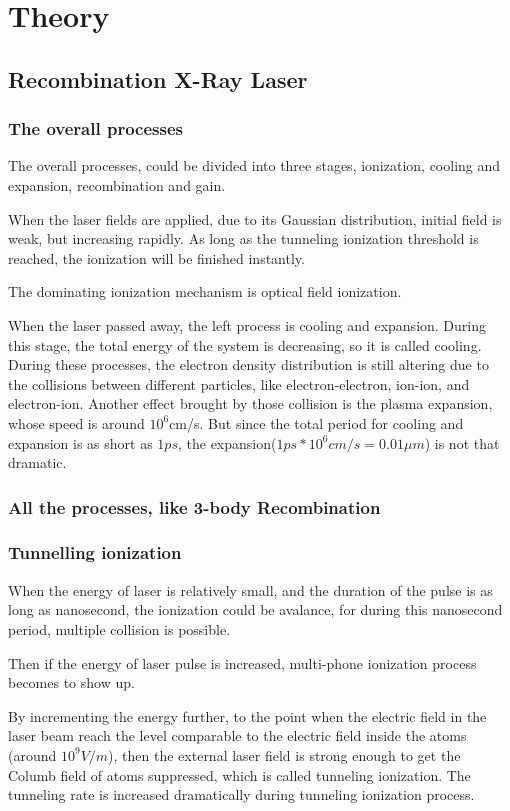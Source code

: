 \chapter{Theory\label{ch:theory}}
\section{Recombination X-Ray Laser}
\subsection{The overall processes}
The overall processes, could be divided into three stages, ionization,
cooling and expansion, recombination and gain.

When the laser fields are applied, due to its Gaussian distribution,
initial field is weak, but increasing rapidly. As long as the
tunneling ionization threshold is reached, the ionization will be
finished instantly.

The dominating ionization mechanism is optical field ionization.

When the laser passed away, the left process is cooling and expansion.
During this stage, the total energy of the system is decreasing, so it
is called cooling. During these processes, the electron density
distribution is still altering due to the collisions between different
particles, like electron-electron, ion-ion, and electron-ion. Another
effect brought by those collision is the plasma expansion, whose speed
is around $10^6$cm/s. But since the total period for cooling and
expansion is as short as $1ps$, the expansion($1ps*10^6cm/s=0.01\mu
m$) is not that dramatic.


\subsection{All the processes, like 3-body Recombination}
\subsection{Tunnelling ionization}
When the energy of laser is relatively small, and the duration of the
pulse is as long as nanosecond, the ionization could be avalance, for
during this nanosecond period, multiple collision is possible.

Then if the energy of laser pulse is increased, multi-phone ionization
process becomes to show up.

By incrementing the energy further, to the point when the electric
field in the laser beam reach the level comparable to the electric
field inside the atoms (around $10^9 V/m$), then the external laser
field is strong enough to get the Columb field of atoms suppressed,
which is called tunneling ionization. The tunneling rate is increased
dramatically during tunneling ionization process.

